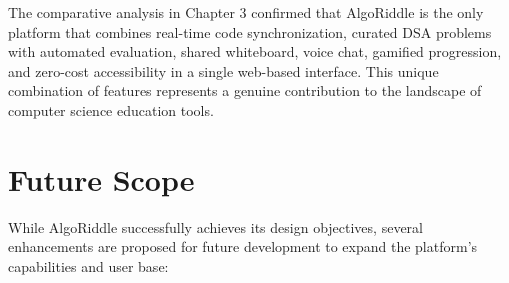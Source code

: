 The comparative analysis in Chapter 3 confirmed that AlgoRiddle is the only platform that combines real-time code synchronization, curated DSA problems with automated evaluation, shared whiteboard, voice chat, gamified progression, and zero-cost accessibility in a single web-based interface. This unique combination of features represents a genuine contribution to the landscape of computer science education tools.

\section{Future Scope}

While AlgoRiddle successfully achieves its design objectives, several enhancements are proposed for future development to expand the platform's capabilities and user base:


